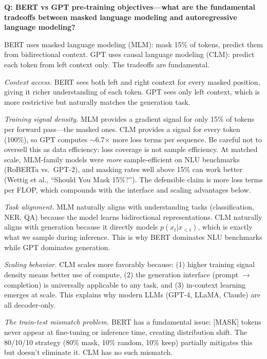 \begin{interviewq}
\textbf{Q: BERT vs GPT pre-training objectives---what are the fundamental tradeoffs between masked language modeling and autoregressive language modeling?}

 \quad {} \quad \badgefreq{\freqhigh}

\stronganswer BERT uses masked language modeling (MLM): mask 15\% of tokens, predict them from bidirectional context. GPT uses causal language modeling (CLM): predict each token from left context only. The tradeoffs are fundamental.

\textit{Context access.} BERT sees both left and right context for every masked position, giving it richer understanding of each token. GPT sees only left context, which is more restrictive but naturally matches the generation task.

\textit{Training signal density.} MLM provides a gradient signal for only 15\% of tokens per forward pass---the masked ones. CLM provides a signal for every token (100\%), so GPT computes $\sim$6.7$\times$ more loss terms per sequence. Be careful not to oversell this as data efficiency: loss coverage is not sample efficiency. At matched scale, MLM-family models were \emph{more} sample-efficient on NLU benchmarks (RoBERTa vs.\ GPT-2), and masking rates well above 15\% can work better (Wettig et al., ``Should You Mask 15\%?''). The defensible claim is more loss terms per FLOP, which compounds with the interface and scaling advantages below.

\textit{Task alignment.} MLM naturally aligns with understanding tasks (classification, NER, QA) because the model learns bidirectional representations. CLM naturally aligns with generation because it directly models $p(x_t | x_{<t})$, which is exactly what we sample during inference. This is why BERT dominates NLU benchmarks while GPT dominates generation.

\textit{Scaling behavior.} CLM scales more favorably because: (1) higher training signal density means better use of compute, (2) the generation interface (prompt $\to$ completion) is universally applicable to any task, and (3) in-context learning emerges at scale. This explains why modern LLMs (GPT-4, LLaMA, Claude) are all decoder-only.

\textit{The train-test mismatch problem.} BERT has a fundamental issue: [MASK] tokens never appear at fine-tuning or inference time, creating distribution shift. The 80/10/10 strategy (80\% mask, 10\% random, 10\% keep) partially mitigates this but doesn't eliminate it. CLM has no such mismatch.


\end{interviewq}
